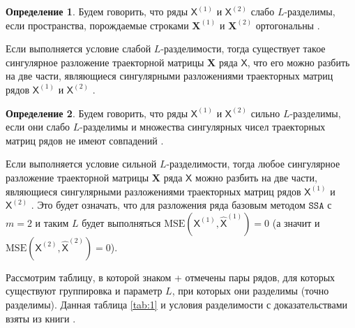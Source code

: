 \documentclass[12pt, specialist, subf
]{disser}
\theoremstyle{definition}
\newcommand{\SSA}{\texttt{SSA}}
\newcommand{\TS}{\mathsf{X}}
\newtheorem{definition}{Определение} %
\begin{document}
\begin{definition}
	Будем говорить, что ряды $\TS^{(1)}$ и $\TS^{(2)}$ слабо $L$-разделимы, если пространства, порождаемые строками $\mathbf{X}^{(1)}$ и $\mathbf{X}^{(2)}$ ортогональны \cite{golyandina2001analysis}.
\end{definition}

Если выполняется условие слабой $L$-разделимости, тогда существует такое сингулярное разложение траекторной матрицы $\mathbf X$ ряда $\TS$, что его можно разбить на две части, являющиеся сингулярными разложениями траекторных матриц рядов $\TS^{(1)}$ и $\TS^{(2)}$ \cite{golyandina2001analysis}.

\begin{definition}
	Будем говорить, что ряды $\TS^{(1)}$ и $\TS^{(2)}$ сильно $L$-разделимы, если они слабо $L$-разделимы и множества сингулярных чисел траекторных матриц рядов не имеют совпадений \cite{golyandina2001analysis}.
\end{definition}

Если выполняется условие сильной $L$-разделимости, тогда любое сингулярное разложение траекторной матрицы $\mathbf X$ ряда $\TS$ можно разбить на две части, являющиеся сингулярными разложениями траекторных матриц рядов $\TS^{(1)}$ и $ \TS^{(2)}$ \cite{golyandina2001analysis}. Это будет означать, что для разложения ряда базовым методом $\SSA$ с $m = 2$ и таким $L$ будет выполняться
\( \mathrm{MSE}\left(\TS^{(1)}, \hat{\TS}^{(1)}\right) = 0 \) (а значит и \( \mathrm{MSE}\left(\TS^{(2)}, \hat{\TS}^{(2)}\right) = 0 \)).


Рассмотрим таблицу, в которой знаком + отмечены пары рядов, для которых существуют группировка и параметр $L$, при которых они разделимы (точно разделимы). Данная таблица \ref{tab:1} и условия разделимости с доказательствами взяты из книги \cite{golyandina2001analysis}.

\begin{table}[H]
	\begin{center}
		\caption{Точная разделимость.}
		\label{tab:1}
	\end{center}
\end{table}
\end{document}

